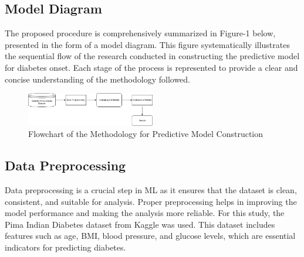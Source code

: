 


\subsection{Model Diagram}
The proposed procedure is comprehensively summarized in Figure-1 below, presented in the form of a model diagram. This figure systematically illustrates the sequential flow of the research conducted in constructing the predictive model for diabetes onset. Each stage of the process is represented to provide a clear and concise understanding of the methodology followed.

\begin{figure}[htpb!]
    \centering
    \includegraphics[width=0.5\textwidth]{Images/test.drawio.png}
    \caption{Flowchart of the Methodology for Predictive Model Construction}
    \label{fig:enter-label}
\end{figure}

\subsection{Data Preprocessing}

Data preprocessing is a crucial step in ML as it ensures that the dataset is clean, consistent, and suitable for analysis. Proper preprocessing helps in improving the model performance and making the analysis more reliable. For this study, the Pima Indian Diabetes dataset from Kaggle was used. This dataset includes features such as age, BMI, blood pressure, and glucose levels, which are essential indicators for predicting diabetes.

